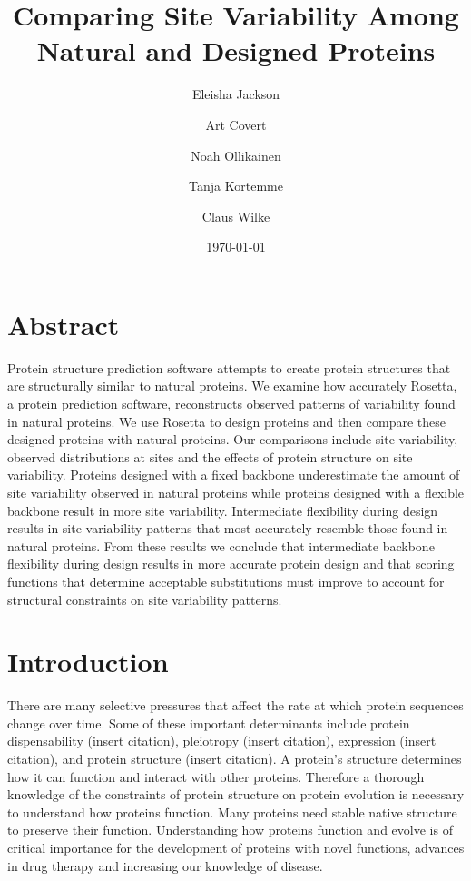 \documentclass[12pt]{article}
\title{Comparing Site Variability Among Natural and Designed Proteins}
\author{Eleisha Jackson \and Art Covert \and Noah Ollikainen \and Tanja Kortemme \and Claus Wilke}
\begin{document}
\date{\today}
\maketitle

\section{Abstract}
\label{Abstract}
Protein structure prediction software attempts to create protein structures that are structurally similar to natural proteins. We examine how accurately Rosetta, a protein prediction software, reconstructs observed patterns of variability found in natural proteins. We use Rosetta to design proteins and then compare these designed proteins with natural proteins. Our comparisons include site variability, observed distributions at sites and the effects of protein structure on site variability. Proteins designed with a fixed backbone underestimate the amount of site variability observed in natural proteins while proteins designed with a flexible backbone result in more site variability. Intermediate flexibility during design results in site variability patterns that most accurately resemble those found in natural proteins. From these results we conclude that intermediate backbone flexibility during design results in more accurate protein design and that scoring functions that determine acceptable substitutions must improve to account for structural constraints on site variability patterns.

\section{Introduction}
\label{Introduction}

There are many selective pressures that affect the rate at which protein sequences change over time. Some of these important determinants include protein dispensability (insert citation), pleiotropy (insert citation), expression (insert citation), and protein structure (insert citation). A protein's structure determines how it can function and interact with other proteins.  Therefore a thorough knowledge of the constraints of protein structure on protein evolution is necessary to understand how proteins function. Many proteins need stable native structure to preserve their function. Understanding how proteins function and evolve is of critical importance for the development of proteins with novel functions, advances in drug therapy and increasing our knowledge of disease.  
\end{document}
